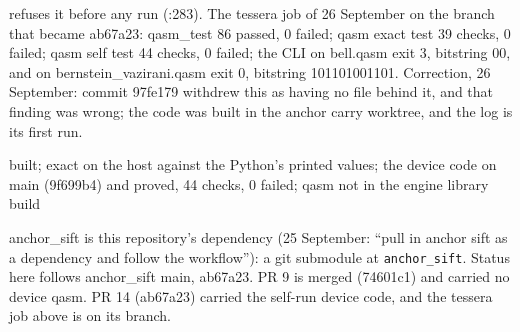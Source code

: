 \begin{description}
refuses it before any run (:283). The tessera job of 26 September on the branch that became ab67a23: qasm\_\allowbreak{}test 86 passed, 0 failed; qasm exact test 39 checks, 0 failed; qasm self test 44 checks, 0 failed; the CLI on bell.qasm exit 3, bitstring 00, and on bernstein\_\allowbreak{}vazirani.qasm exit 0, bitstring 101101001101. Correction, 26 September: commit 97fe179 withdrew this as having no file behind it, and that finding was wrong; the code was built in the anchor carry worktree, and the log is its first run.
\item[{status}] built; exact on the host against the Python's printed values; the device code on main (9f699b4) and proved, 44 checks, 0 failed; qasm not in the engine library build
\item[{next}] anchor\_\allowbreak{}sift is this repository's dependency (25 September: “pull in anchor sift as a dependency and follow the workflow”): a git submodule at \texttt{anchor\_\allowbreak{}sift}. Status here follows anchor\_\allowbreak{}sift main, ab67a23. PR 9 is merged (74601c1) and carried no device qasm. PR 14 (ab67a23) carried the self-run device code, and the tessera job above is on its branch.
\end{description}

